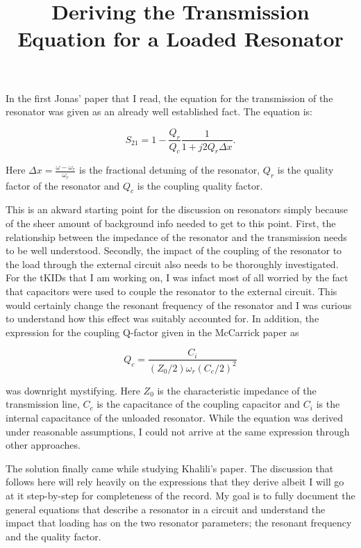 \documentclass[12pt]{article}
\begin{document}
\title{Deriving the Transmission Equation for a Loaded Resonator}

In the first Jonas' paper that I read, the equation for the transmission of the resonator was given as an already well established fact. The equation is: 

\begin{equation}
S_{21} = 1 - \frac{Q_r}{Q_c}\frac{1}{1 + j 2 Q_r \Delta x}.
\end{equation}
 
Here $\Delta x = \frac{\omega - \omega_r}{\omega_r}$ is the fractional detuning of the resonator, $Q_r$ is the quality factor of the resonator and $Q_c$ is the coupling quality factor.

This is an akward starting point for the discussion on resonators simply because of the sheer amount of background info needed to get to this point. First, the relationship between the impedance of the resonator and the transmission needs to be well understood. Secondly, the impact of the coupling of the resonator to the load through the external circuit also needs to be thoroughly investigated. For the tKIDs that I am working on, I was infact most of all worried by the fact that capacitors were used to couple the resonator to the external circuit. This would certainly change the resonant frequency of the resonator and I was curious to understand how this effect was suitably accounted for. In addition, the expression for the coupling Q-factor given in the McCarrick paper as 

\begin{equation}
Q_c = \frac{C_i}{\left(Z_0/2\right) \omega_r \left(C_c/2\right)^2}
\end{equation} 

was downright mystifying. Here $Z_0$ is the characteristic impedance of the transmission line, $C_c$ is the capacitance of the coupling capacitor and $C_i$ is the internal capacitance of the unloaded resonator. While the equation was derived under reasonable assumptions, I could not arrive at the same expression through other approaches. 

The solution finally came while studying Khalili's paper. The discussion that follows here will rely heavily on the expressions that they derive albeit I will go at it step-by-step for completeness of the record. My goal is to fully document the general equations that describe a resonator in a circuit and understand the impact that loading has on the two resonator parameters; the resonant frequency and the quality factor.
\end{document}

